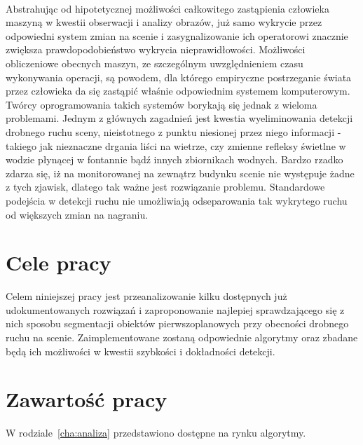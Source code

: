 \paragraph{}
Abstrahując od hipotetycznej możliwości całkowitego zastąpienia człowieka maszyną w kwestii obserwacji i analizy obrazów, już samo wykrycie przez odpowiedni system zmian na scenie i zasygnalizowanie ich operatorowi znacznie zwiększa prawdopodobieństwo wykrycia nieprawidłowości. Możliwości obliczeniowe obecnych maszyn, ze szczególnym uwzględnieniem czasu wykonywania operacji, są powodem, dla którego empiryczne postrzeganie świata przez człowieka da się zastąpić właśnie odpowiednim systemem komputerowym. Twórcy oprogramowania takich systemów borykają się jednak z wieloma problemami. Jednym z głównych zagadnień jest kwestia wyeliminowania detekcji drobnego ruchu sceny, nieistotnego z punktu niesionej przez niego informacji - takiego jak nieznaczne drgania liści na wietrze, czy zmienne refleksy świetlne w wodzie płynącej w fontannie bądź innych zbiornikach wodnych. Bardzo rzadko zdarza się, iż na monitorowanej na zewnątrz budynku scenie nie występuje żadne z tych zjawisk, dlatego tak ważne jest rozwiązanie problemu. Standardowe podejścia w detekcji ruchu nie umożliwiają odseparowania tak wykrytego ruchu od większych zmian na nagraniu.


\section{Cele pracy}
\label{sec:celePracy}

Celem niniejszej pracy jest przeanalizowanie kilku dostępnych już udokumentowanych rozwiązań i zaproponowanie najlepiej sprawdzającego się z nich sposobu segmentacji obiektów pierwszoplanowych przy obecności drobnego ruchu na scenie. Zaimplementowane zostaną odpowiednie algorytmy oraz zbadane będą ich możliwości w kwestii szybkości i dokładności detekcji. 



\section{Zawartość pracy}
\label{sec:zawartoscPracy}

W rodziale~\ref{cha:analiza} przedstawiono dostępne na rynku algorytmy. 


















